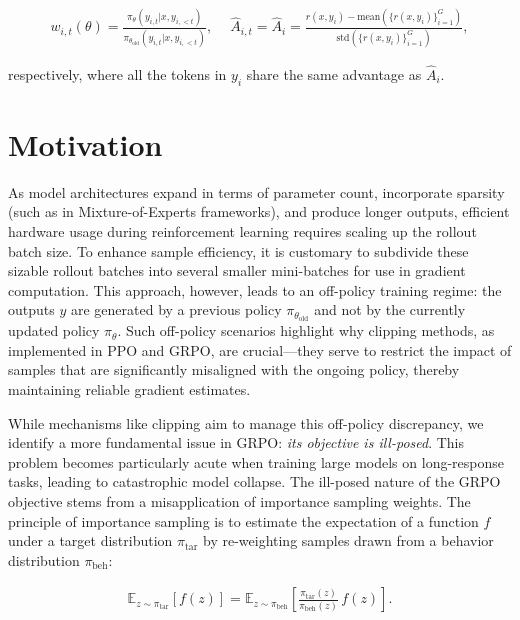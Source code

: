 \begin{align}
    w_{i,t}(\theta)=\frac{ \pi_{\theta} (y_{i,t} | x, y_{i,<t}) }{ \pi_{\theta_\text{old}} (y_{i,t} | x,y_{i,<t})},\quad\ 
    \widehat{A}_{i,t} = \widehat{A}_{i} = \frac{r(x, y_i) - \mathrm{mean} \left( \{ r(x, y_i) \}_{i=1}^G \right) }{ \mathrm{std} \left( \{ r(x, y_i) \}_{i=1}^G \right) },
\end{align}

respectively, where all the tokens in $y_i$ share the same advantage as $\widehat{A}_{i}$.

\section{Motivation}
\label{sec:motivation}

As model architectures expand in terms of parameter count, incorporate sparsity (such as in Mixture-of-Experts frameworks), and produce longer outputs, efficient hardware usage during reinforcement learning requires scaling up the rollout batch size. To enhance sample efficiency, it is customary to subdivide these sizable rollout batches into several smaller mini-batches for use in gradient computation. This approach, however, leads to an off-policy training regime: the outputs $y$ are generated by a previous policy $\pi_{\theta_\text{old}}$ and not by the currently updated policy $\pi_\theta$. Such off-policy scenarios highlight why clipping methods, as implemented in PPO and GRPO, are crucial—they serve to restrict the impact of samples that are significantly misaligned with the ongoing policy, thereby maintaining reliable gradient estimates.

While mechanisms like clipping aim to manage this off-policy discrepancy, we identify a more fundamental issue in GRPO: \textit{its objective is ill-posed}. This problem becomes particularly acute when training large models on long-response tasks, leading to catastrophic model collapse. The ill-posed nature of the GRPO objective stems from a misapplication of importance sampling weights. The principle of importance sampling is to estimate the expectation of a function $f$ under a target distribution $\pi_\text{tar}$ by re-weighting samples drawn from a behavior distribution $\pi_\text{beh}$:

\begin{align}
\mathbb{E}_{z \sim \pi_\text{tar}} \left[ f(z) \right] = \mathbb{E}_{z \sim \pi_\text{beh}} \left[ \frac{ \pi_\text{tar} (z) }{ \pi_\text{beh} (z)} \, f(z) \right].
\end{align}

